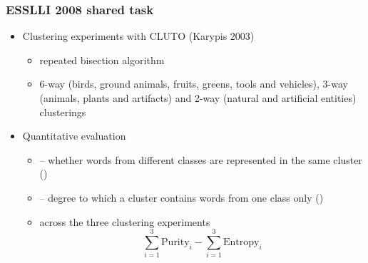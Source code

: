 \documentclass[t]{beamer} %
\begin{document}
\begin{frame}
\frametitle{ESSLLI 2008 shared task}
\begin{itemize}
\item Clustering experiments with CLUTO (Karypis 2003)
\begin{itemize}
\item repeated bisection algorithm
\item 6-way (birds, ground animals, fruits, greens,
tools and vehicles), 3-way (animals, plants and
artifacts) and 2-way (natural and artificial entities) clusterings
\end{itemize}
\pause
\item Quantitative evaluation
\begin{itemize}
\item {} -- whether words from different classes are represented in the same cluster ()
\item {} -- degree to which a cluster contains words from one class only ()
\item {} across the three clustering experiments
\begin{displaymath}
\sum_{i=1}^3 \text{Purity}_i -  \sum_{i=1}^3 \text{Entropy}_i
\end{displaymath}

\end{itemize}
\end{itemize}
\end{frame}
\end{document}
